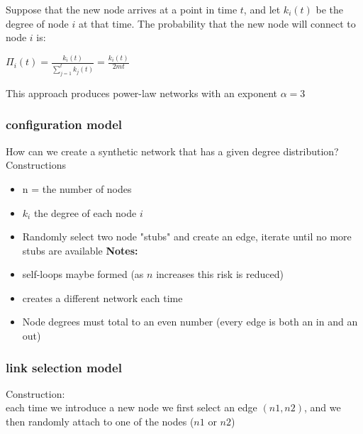 \documentclass[crop=false]{standalone}
\begin{document}
Suppose that the new node arrives at a point in time $t$, and let $k_i(t)$ be the degree of node $i$ at that time. The probability that the new node will connect to node $i$ is:​

$\Pi_i(t) = \frac{k_i(t)}{\sum \limits _{j=1}^t k_j(t)} = \frac{k_i(t)}{2 m t}$

This approach produces power-law networks with an exponent $\alpha=3$
\subsubsection{configuration model}
How can we create a synthetic network that has a given degree distribution?
Constructions
\begin{itemize}
    \item n = the number of nodes
    \item $k_i$ the degree of each node $i$
    \item Randomly select two node "stubs" and create an edge, iterate until no more stubs are available
\textbf{Notes:}
\item self-loops maybe formed (as $n$ increases this risk is reduced)
\item creates a different network each time
\item Node degrees must total to an even number (every edge is both an in and an out)


\end{itemize}
\subsubsection{link selection model}
Construction: \\
each time we introduce a new node we first select an edge $(n1,n2)$, and we then randomly attach to one of the nodes ($n1$ or $n2$)
\end{document}
